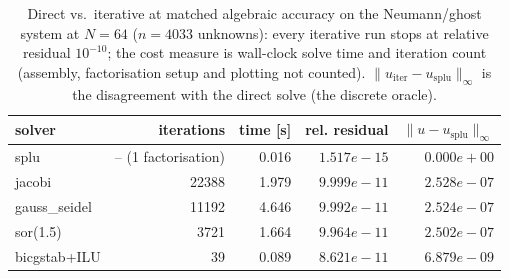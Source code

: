 \begin{table}[H]
\centering\small
\caption{Direct vs.\ iterative at matched algebraic accuracy on the Neumann/ghost system at $N=64$ ($n=4033$ unknowns): every iterative run stops at relative residual $10^{-10}$; the cost measure is wall-clock solve time and iteration count (assembly, factorisation setup and plotting not counted). $\lVert u_{\mathrm{iter}}-u_{\mathrm{splu}}\rVert_{\infty}$ is the disagreement with the direct solve (the discrete oracle).}
\label{tab:solvers}
\begin{tabular}{lrrrr}
\toprule
solver & iterations & time [s] & rel. residual & $\lVert u-u_{\mathrm{splu}}\rVert_{\infty}$ \\
\midrule
splu & -- (1 factorisation) & 0.016 & $1.517e-15$ & $0.000e+00$ \\
jacobi & 22388 & 1.979 & $9.999e-11$ & $2.528e-07$ \\
gauss\_seidel & 11192 & 4.646 & $9.992e-11$ & $2.524e-07$ \\
sor(1.5) & 3721 & 1.664 & $9.964e-11$ & $2.502e-07$ \\
bicgstab+ILU & 39 & 0.089 & $8.621e-11$ & $6.879e-09$ \\
\bottomrule
\end{tabular}
\end{table}